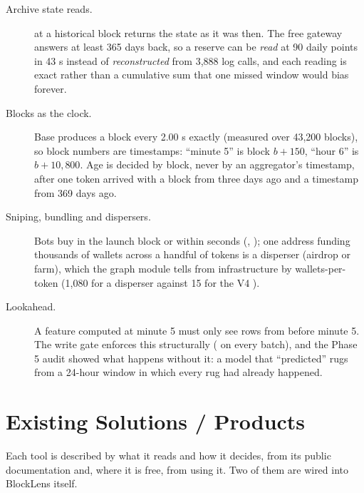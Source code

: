 \begin{description}
  \item[Archive state reads.]  at a historical block returns the state as it was then. The free gateway answers at least 365 days back, so a reserve can be \emph{read} at 90 daily points in 43 s instead of \emph{reconstructed} from 3,888 log calls, and each reading is exact rather than a cumulative sum that one missed window would bias forever.
  \item[Blocks as the clock.] Base produces a block every 2.00 s exactly (measured over 43,200 blocks), so block numbers are timestamps: ``minute 5'' is block $b+150$, ``hour 6'' is $b+10{,}800$. Age is decided by block, never by an aggregator's timestamp, after one token arrived with a block from three days ago and a timestamp from 369 days ago.
  \item[Sniping, bundling and dispersers.] Bots buy in the launch block or within seconds (, ); one address funding thousands of wallets across a handful of tokens is a disperser (airdrop or farm), which the graph module tells from infrastructure by wallets-per-token (1,080 for a disperser against 15 for the V4 ).
  \item[Lookahead.] A feature computed at minute 5 must only see rows from before minute 5. The write gate enforces this structurally ( on every batch), and the Phase 5 audit showed what happens without it: a model that ``predicted'' rugs from a 24-hour window in which every rug had already happened.
\end{description}

\section{Existing Solutions / Products}
\label{sec:existing}
Each tool is described by what it reads and how it decides, from its public documentation and, where it is free, from using it. Two of them are wired into BlockLens itself.


